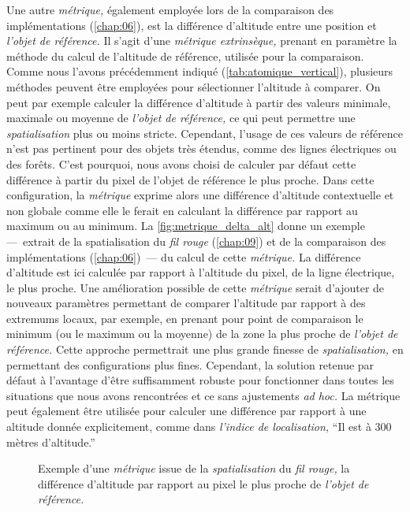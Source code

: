 Une autre \emph{métrique,} également employée lors de la comparaison
des implémentations (\autoref{chap:06}), est la différence d'altitude
entre une position et \emph{l'objet de référence.} Il s'agit d'une
\emph{métrique extrinsèque,} prenant en paramètre la méthode du calcul
de l'altitude de référence, utilisée pour la comparaison. Comme nous
l'avons précédemment indiqué (\autoref{tab:atomique_vertical}),
plusieurs méthodes peuvent être employées pour sélectionner l'altitude
à comparer. On peut par exemple calculer la différence d'altitude à
partir des valeurs minimale, maximale ou moyenne de \emph{l'objet de
  référence,} ce qui peut permettre une \emph{spatialisation} plus ou
moins stricte. Cependant, l'usage de ces valeurs de référence n'est
pas pertinent pour des objets très étendus, comme des lignes
électriques ou des forêts. C'est pourquoi, nous avons choisi de
calculer par défaut cette différence à partir du pixel de l'objet de
référence le plus proche. Dans cette configuration, la \emph{métrique}
 exprime alors une différence d'altitude contextuelle
et non globale comme elle le ferait en calculant la différence par
rapport au maximum ou au minimum. La \autoref{fig:metrique_delta_alt}
donne un exemple ---~extrait de la spatialisation du \emph{fil rouge}
(\autoref{chap:09}) et de la comparaison des implémentations
(\autoref{chap:06})~--- du calcul de cette \emph{métrique.} La
différence d'altitude est ici calculée par rapport à l'altitude du
pixel, de la ligne électrique, le plus proche. Une amélioration
possible de cette \emph{métrique} serait d'ajouter de nouveaux
paramètres permettant de comparer l'altitude par rapport à des
extremums locaux, par exemple, en prenant pour point de comparaison le
minimum (ou le maximum ou la moyenne) de la zone la plus proche de
\emph{l'objet de référence.} Cette approche permettrait une plus
grande finesse de \emph{spatialisation,} en permettant des
configurations plus fines. Cependant, la solution retenue par défaut à
l'avantage d'être suffisamment robuste pour fonctionner dans toutes
les situations que nous avons rencontrées et ce sans ajustements
\emph{ad hoc.} La métrique  peut également être
utilisée pour calculer une différence par rapport à une altitude
donnée explicitement, comme dans \emph{l'indice de localisation,}
\enquote{Il est à 300 mètres d'altitude.}

\begin{figure}
  \centering
  
  \caption{Exemple d'une \emph{métrique} issue de la
    \emph{spatialisation} du \emph{fil rouge,} la différence
    d'altitude par rapport au pixel le plus proche de \emph{l'objet de
      référence.}}
  \label{fig:metrique_delta_alt}
\end{figure}

